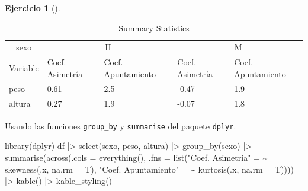 \documentclass[
  a4paper,
]{scrreport}
\newenvironment{Shaded}{\begin{snugshade}}{\end{snugshade}}
\newcommand{\AttributeTok}[1]{\textcolor[rgb]{0.40,0.45,0.13}{#1}}
\newcommand{\ErrorTok}[1]{\textcolor[rgb]{0.68,0.00,0.00}{#1}}
\newcommand{\FunctionTok}[1]{\textcolor[rgb]{0.28,0.35,0.67}{#1}}
\newcommand{\NormalTok}[1]{\textcolor[rgb]{0.00,0.23,0.31}{#1}}
\newcommand{\OtherTok}[1]{\textcolor[rgb]{0.00,0.23,0.31}{#1}}
\newcommand{\SpecialCharTok}[1]{\textcolor[rgb]{0.37,0.37,0.37}{#1}}
\newcommand{\StringTok}[1]{\textcolor[rgb]{0.13,0.47,0.30}{#1}}
\theoremstyle{definition}
\newtheorem{exercise}{Ejercicio}[chapter]
\theoremstyle{remark}
\begin{document}
\begin{exercise}[]
\begin{enumerate}
\begin{tcolorbox}
  \begin{table}

  \caption{Summary Statistics}
  \centering
  \begin{tabular}[t]{lllll}
  \toprule
  \multicolumn{1}{c}{sexo} & \multicolumn{2}{c}{H} & \multicolumn{2}{c}{M} \\
  \cmidrule(l{3pt}r{3pt}){1-1} \cmidrule(l{3pt}r{3pt}){2-3} \cmidrule(l{3pt}r{3pt}){4-5}
  Variable & Coef. Asimetría & Coef. Apuntamiento & Coef. Asimetría & Coef. Apuntamiento\\
  \midrule
  peso & 0.61 & 2.5 & -0.47 & 1.9\\
  altura & 0.27 & 1.9 & -0.07 & 1.8\\
  \bottomrule
  \end{tabular}
  \end{table}

  \end{tcolorbox}

  \begin{tcolorbox}[enhanced jigsaw, breakable, toptitle=1mm, colbacktitle=quarto-callout-tip-color!10!white, rightrule=.15mm, opacityback=0, opacitybacktitle=0.6, titlerule=0mm, coltitle=black, colframe=quarto-callout-tip-color-frame, colback=white, bottomtitle=1mm, leftrule=.75mm, toprule=.15mm, title=\textcolor{quarto-callout-tip-color}{\faLightbulb}\hspace{0.5em}{Solución 2}, arc=.35mm, bottomrule=.15mm, left=2mm]

  Usando las funciones \texttt{group\_by} y \texttt{summarise} del
  paquete \href{}{\texttt{dplyr}}.

\begin{Shaded}
\begin{Highlighting}[]
\FunctionTok{library}\NormalTok{(dplyr)}
\NormalTok{df }\SpecialCharTok{|\textgreater{}} \FunctionTok{select}\NormalTok{(sexo, peso, altura) }\SpecialCharTok{|\textgreater{}}
\FunctionTok{group\_by}\NormalTok{(sexo) }\SpecialCharTok{|\textgreater{}}
\FunctionTok{summarise}\NormalTok{(}\FunctionTok{across}\NormalTok{(}\AttributeTok{.cols =} \FunctionTok{everything}\NormalTok{(), }\AttributeTok{.fns =} \FunctionTok{list}\NormalTok{(}\StringTok{"Coef. Asimetría"} \OtherTok{=} \ErrorTok{\textasciitilde{}} \FunctionTok{skewness}\NormalTok{(.x, }\AttributeTok{na.rm =}\NormalTok{ T), }\StringTok{"Coef. Apuntamiento"} \OtherTok{=} \ErrorTok{\textasciitilde{}} \FunctionTok{kurtosis}\NormalTok{(.x, }\AttributeTok{na.rm =}\NormalTok{ T)))) }\SpecialCharTok{|\textgreater{}}
\FunctionTok{kable}\NormalTok{() }\SpecialCharTok{|\textgreater{}}
\FunctionTok{kable\_styling}\NormalTok{()}
\end{Highlighting}
\end{Shaded}


\end{tcolorbox}
\end{enumerate}
\end{exercise}
\end{document}
